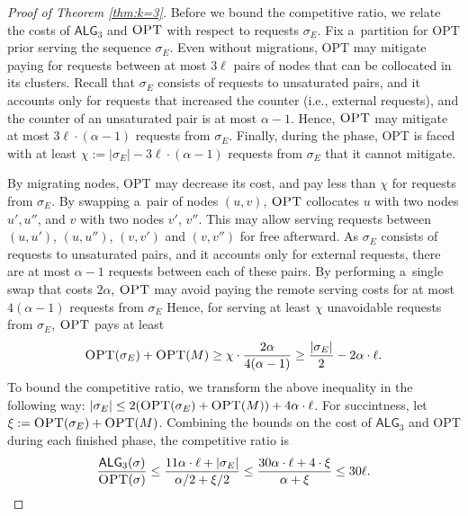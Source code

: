 \documentclass[a4paper,anonymous,USenglish]{lipics-v2019}
\newcommand{\OPT}{\textsc{OPT}\xspace}
\newcommand{\TAlg}{{\ensuremath{\textsf{ALG}_{3}}}\xspace}
\begin{document}
\begin{proof}[Proof of Theorem \ref{thm:k=3}]
	\medskip
	Before we bound the competitive ratio, we relate the costs of $\TAlg$ and $\OPT$ with respect to requests $\sigma_E$.
	Fix a~partition for \OPT prior serving the sequence $\sigma_E$.
	Even without migrations, \OPT may mitigate paying for requests between at most $3\ell$ pairs of nodes that can be collocated in its clusters.
	Recall that $\sigma_E$ consists of requests to unsaturated pairs, and it accounts only for requests that increased the counter (i.e., external requests), and the counter of an unsaturated pair is at most $\alpha - 1$.
	Hence, $\OPT$ may mitigate at most $3\ell\cdot(\alpha - 1)$ requests from $\sigma_E$.
	Finally, during the phase, \OPT is faced with at least $\chi := |\sigma_E| - 3\ell\cdot(\alpha-1)$ requests from $\sigma_E$ that it cannot mitigate.

	By migrating nodes, \OPT may decrease its cost, and pay less than $\chi$ for requests from $\sigma_E$.
	By swapping a~pair of nodes $(u,v)$, $\OPT$ collocates $u$ with two nodes $u', u''$, and $v$ with two nodes $v'$, $v''$.
	This may allow serving requests between $(u,u')$, $(u,u'')$, $(v,v')$ and $(v,v'')$ for free afterward.
	As $\sigma_E$ consists of requests to unsaturated pairs, and it accounts only for external requests, there are at most $\alpha-1$ requests between each of these pairs.
	By performing a~single swap that costs $2\alpha$, $\OPT$ may avoid paying the remote serving costs for at most $4 (\alpha - 1)$ requests from $\sigma_E$
	Hence, for serving at least $\chi$ unavoidable requests from $\sigma_E$, $\OPT$ pays at least
	\[
		\OPT(\sigma_E) + \OPT(M) \geq \chi \cdot \frac{2\alpha}{4 (\alpha-1)}\geq \frac{|\sigma_E|} {2} - 2 \alpha \cdot \ell.
	\]
	To bound the competitive ratio, we transform the above inequality in the following way: $|\sigma_E| \leq 2(\OPT(\sigma_E)+\OPT(M)) + 4\alpha \cdot \ell$.
	For succintness, let $\xi := \OPT(\sigma_E) + \OPT(M)$.
	Combining the bounds on the cost of \TAlg and \OPT during each finished phase, the competitive ratio is
%
	\[
		\frac{\TAlg(\sigma)}{\OPT(\sigma)} \leq \frac{11\alpha \cdot \ell + |\sigma_E|}{\alpha/2 + \xi/2} \leq \frac{30\alpha\cdot\ell + 4\cdot \xi}{\alpha + \xi} \leq 30 \ell.
	\]
%	
	\medskip
	

\end{proof}
\end{document}
